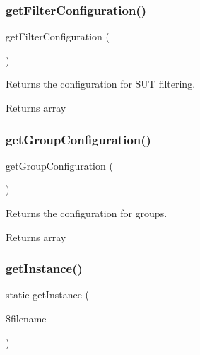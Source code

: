 \subsubsection{\texorpdfstring{get\+Filter\+Configuration()}{getFilterConfiguration()}}
{\footnotesize\ttfamily get\+Filter\+Configuration (\begin{DoxyParamCaption}{ }\end{DoxyParamCaption})}

Returns the configuration for S\+UT filtering.

\begin{DoxyReturn}{Returns}
array 
\end{DoxyReturn}
\mbox{\label{class_p_h_p_unit___util___configuration_afa88979f7ae48c0f0745443305631057}} 
\subsubsection{\texorpdfstring{get\+Group\+Configuration()}{getGroupConfiguration()}}
{\footnotesize\ttfamily get\+Group\+Configuration (\begin{DoxyParamCaption}{ }\end{DoxyParamCaption})}

Returns the configuration for groups.

\begin{DoxyReturn}{Returns}
array 
\end{DoxyReturn}
\mbox{\label{class_p_h_p_unit___util___configuration_a13034fd6b1dcf949e6c26dc8c4e464cb}} 
\subsubsection{\texorpdfstring{get\+Instance()}{getInstance()}}
{\footnotesize\ttfamily static get\+Instance (\begin{DoxyParamCaption}\item[{}]{\$filename }\end{DoxyParamCaption})\hspace{0.3cm}{\ttfamily [static]}}


